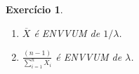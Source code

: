 \documentclass[letter,11pt]{article}
\newtheorem{exer}{Exercício}
\begin{document}
% 
% 
% 
% 



\begin{exer} \rm
\begin{enumerate}[\bf(a)]
\item %
$\overline{X}$ é ENVVUM de $1/\lambda $.

\item %
$\frac{(n-1)}{\sum_{i=1}^{n}X_i}$ é ENVVUM de $\lambda$.

\end{enumerate}
\end{exer}
\end{document}
